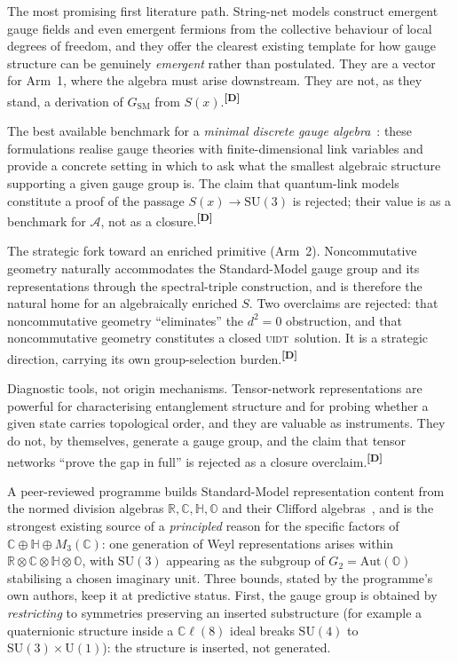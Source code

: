 \documentclass[12pt,a4paper,twoside]{article}
\theoremstyle{plain}
\theoremstyle{definition}
\theoremstyle{remark}
\newcommand{\UIDT}{\textsc{uidt}}
\newcommand{\catmark}[1]{\textsuperscript{\textsf{\textbf{[#1]}}}}
\begin{document}
\begin{description}[leftmargin=1.4em,style=nextline]
\item[String-net condensation and topological order.] The most promising first literature path. String-net models construct emergent gauge fields and even emergent fermions from the collective behaviour of local degrees of freedom, and they offer the clearest existing template for how gauge structure can be genuinely \emph{emergent} rather than postulated. They are a vector for Arm~1, where the algebra must arise downstream. They are not, as they stand, a derivation of $G_{\mathrm{SM}}$ from $S(x)$.\catmark{D} \item[Quantum-link models and D-theory.] The best available benchmark for a \emph{minimal discrete gauge algebra}~\cite{brower1999,brower2004,beard1998}: these formulations realise gauge theories with finite-dimensional link variables and provide a concrete setting in which to ask what the smallest algebraic structure supporting a given gauge group is. The claim that quantum-link models constitute a proof of the passage $S(x)\to\mathrm{SU}(3)$ is rejected; their value is as a benchmark for $\mathcal{A}$, not as a closure.\catmark{D} \item[Noncommutative geometry.] The strategic fork toward an enriched primitive (Arm~2). Noncommutative geometry naturally accommodates the Standard-Model gauge group and its representations through the spectral-triple construction, and is therefore the natural home for an algebraically enriched $S$. Two overclaims are rejected: that noncommutative geometry ``eliminates'' the $d^2=0$ obstruction, and that noncommutative geometry constitutes a closed \UIDT\ solution. It is a strategic direction, carrying its own group-selection burden.\catmark{D} \item[Tensor networks.] Diagnostic tools, not origin mechanisms. Tensor-network representations are powerful for characterising entanglement structure and for probing whether a given state carries topological order, and they are valuable as instruments. They do not, by themselves, generate a gauge group, and the claim that tensor networks ``prove the gap in full'' is rejected as a closure overclaim.\catmark{D} \item[Division-algebra constructions.] A peer-reviewed programme builds Standard-Model representation content from the normed division algebras $\mathbb{R},\mathbb{C},\mathbb{H},\mathbb{O}$ and their Clifford algebras~\cite{furey2018,furey2025,gourlay2024}, and is the strongest existing source of a \emph{principled} reason for the specific factors of $\mathbb{C}\oplus\mathbb{H}\oplus M_3(\mathbb{C})$: one generation of Weyl representations arises within $\mathbb{R}\otimes\mathbb{C}\otimes\mathbb{H}\otimes\mathbb{O}$, with $\mathrm{SU}(3)$ appearing as the subgroup of $G_2=\mathrm{Aut}(\mathbb{O})$ stabilising a chosen imaginary unit. Three bounds, stated by the programme's own authors, keep it at predictive status. First, the gauge group is obtained by \emph{restricting} to symmetries preserving an inserted substructure (for example a quaternionic structure inside a $\mathbb{C}\ell(8)$ ideal breaks $\mathrm{SU}(4)$ to $\mathrm{SU}(3)\times\mathrm{U}(1)$): the structure is inserted, not generated. 
\end{description}
\end{document}
